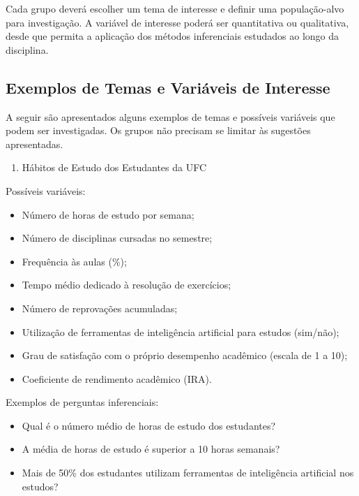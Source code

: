 \documentclass[
  letterpaper,
  DIV=11,
  numbers=noendperiod]{scrreprt}
\providecommand{\tightlist}{%
  \setlength{\itemsep}{0pt}\setlength{\parskip}{0pt}}\usepackage{longtable,booktabs,array}
\begin{document}
Cada grupo deverá escolher um tema de interesse e definir uma
população-alvo para investigação. A variável de interesse poderá ser
quantitativa ou qualitativa, desde que permita a aplicação dos métodos
inferenciais estudados ao longo da disciplina.

\subsection{Exemplos de Temas e Variáveis de
Interesse}\label{exemplos-de-temas-e-variuxe1veis-de-interesse}

A seguir são apresentados alguns exemplos de temas e possíveis variáveis
que podem ser investigadas. Os grupos não precisam se limitar às
sugestões apresentadas.

\begin{enumerate}
\def\labelenumi{\arabic{enumi}.}
\tightlist
\item
  Hábitos de Estudo dos Estudantes da UFC
\end{enumerate}

Possíveis variáveis:

\begin{itemize}
\tightlist
\item
  Número de horas de estudo por semana;
\item
  Número de disciplinas cursadas no semestre;
\item
  Frequência às aulas (\%);
\item
  Tempo médio dedicado à resolução de exercícios;
\item
  Número de reprovações acumuladas;
\item
  Utilização de ferramentas de inteligência artificial para estudos
  (sim/não);
\item
  Grau de satisfação com o próprio desempenho acadêmico (escala de 1 a
  10);
\item
  Coeficiente de rendimento acadêmico (IRA).
\end{itemize}

Exemplos de perguntas inferenciais:

\begin{itemize}
\tightlist
\item
  Qual é o número médio de horas de estudo dos estudantes?
\item
  A média de horas de estudo é superior a 10 horas semanais?
\item
  Mais de 50\% dos estudantes utilizam ferramentas de inteligência
  artificial nos estudos?
\end{itemize}
\end{document}
